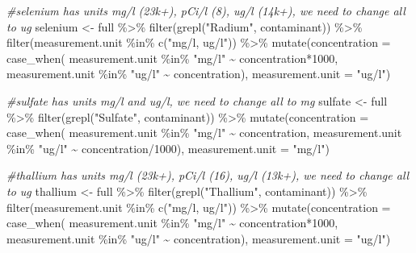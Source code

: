 \documentclass[12pt, twoside]{amherstthesis}
\newenvironment{Shaded}{\begin{snugshade}}{\end{snugshade}}
\newcommand{\AttributeTok}[1]{\textcolor[rgb]{0.77,0.63,0.00}{#1}}
\newcommand{\CommentTok}[1]{\textcolor[rgb]{0.56,0.35,0.01}{\textit{#1}}}
\newcommand{\DecValTok}[1]{\textcolor[rgb]{0.00,0.00,0.81}{#1}}
\newcommand{\FunctionTok}[1]{\textcolor[rgb]{0.00,0.00,0.00}{#1}}
\newcommand{\NormalTok}[1]{#1}
\newcommand{\OtherTok}[1]{\textcolor[rgb]{0.56,0.35,0.01}{#1}}
\newcommand{\SpecialCharTok}[1]{\textcolor[rgb]{0.00,0.00,0.00}{#1}}
\newcommand{\StringTok}[1]{\textcolor[rgb]{0.31,0.60,0.02}{#1}}
\begin{document}
\begin{Shaded}
\begin{Highlighting}[]
\CommentTok{\#selenium has units mg/l (23k+), pCi/l (8), ug/l (14k+), we need to change all to ug}
\NormalTok{selenium }\OtherTok{\textless{}{-}}\NormalTok{ full }\SpecialCharTok{\%\textgreater{}\%}
  \FunctionTok{filter}\NormalTok{(}\FunctionTok{grepl}\NormalTok{(}\StringTok{"Radium"}\NormalTok{, contaminant)) }\SpecialCharTok{\%\textgreater{}\%}
  \FunctionTok{filter}\NormalTok{(measurement.unit }\SpecialCharTok{\%in\%} \FunctionTok{c}\NormalTok{(}\StringTok{"mg/l, ug/l"}\NormalTok{)) }\SpecialCharTok{\%\textgreater{}\%}
  \FunctionTok{mutate}\NormalTok{(}\AttributeTok{concentration =} 
           \FunctionTok{case\_when}\NormalTok{(}
\NormalTok{             measurement.unit }\SpecialCharTok{\%in\%} \StringTok{"mg/l"} \SpecialCharTok{\textasciitilde{}}\NormalTok{ concentration}\SpecialCharTok{*}\DecValTok{1000}\NormalTok{,}
\NormalTok{             measurement.unit }\SpecialCharTok{\%in\%} \StringTok{"ug/l"} \SpecialCharTok{\textasciitilde{}}\NormalTok{ concentration),}
         \AttributeTok{measurement.unit =} \StringTok{"ug/l"}\NormalTok{)  }

\CommentTok{\#sulfate has units mg/l and ug/l, we need to change all to mg}
\NormalTok{sulfate }\OtherTok{\textless{}{-}}\NormalTok{ full }\SpecialCharTok{\%\textgreater{}\%}
  \FunctionTok{filter}\NormalTok{(}\FunctionTok{grepl}\NormalTok{(}\StringTok{"Sulfate"}\NormalTok{, contaminant)) }\SpecialCharTok{\%\textgreater{}\%}
  \FunctionTok{mutate}\NormalTok{(}\AttributeTok{concentration =} 
           \FunctionTok{case\_when}\NormalTok{(}
\NormalTok{             measurement.unit }\SpecialCharTok{\%in\%} \StringTok{"mg/l"} \SpecialCharTok{\textasciitilde{}}\NormalTok{ concentration,}
\NormalTok{             measurement.unit }\SpecialCharTok{\%in\%} \StringTok{"ug/l"} \SpecialCharTok{\textasciitilde{}}\NormalTok{ concentration}\SpecialCharTok{/}\DecValTok{1000}\NormalTok{),}
         \AttributeTok{measurement.unit =} \StringTok{"mg/l"}\NormalTok{)}

\CommentTok{\#thallium has units mg/l (23k+), pCi/l (16), ug/l (13k+), we need to change all to ug}
\NormalTok{thallium }\OtherTok{\textless{}{-}}\NormalTok{ full }\SpecialCharTok{\%\textgreater{}\%}
  \FunctionTok{filter}\NormalTok{(}\FunctionTok{grepl}\NormalTok{(}\StringTok{"Thallium"}\NormalTok{, contaminant)) }\SpecialCharTok{\%\textgreater{}\%}
  \FunctionTok{filter}\NormalTok{(measurement.unit }\SpecialCharTok{\%in\%} \FunctionTok{c}\NormalTok{(}\StringTok{"mg/l, ug/l"}\NormalTok{)) }\SpecialCharTok{\%\textgreater{}\%}
  \FunctionTok{mutate}\NormalTok{(}\AttributeTok{concentration =} 
           \FunctionTok{case\_when}\NormalTok{(}
\NormalTok{             measurement.unit }\SpecialCharTok{\%in\%} \StringTok{"mg/l"} \SpecialCharTok{\textasciitilde{}}\NormalTok{ concentration}\SpecialCharTok{*}\DecValTok{1000}\NormalTok{,}
\NormalTok{             measurement.unit }\SpecialCharTok{\%in\%} \StringTok{"ug/l"} \SpecialCharTok{\textasciitilde{}}\NormalTok{ concentration),}
         \AttributeTok{measurement.unit =} \StringTok{"ug/l"}\NormalTok{)  }


\end{Highlighting}
\end{Shaded}
\end{document}
